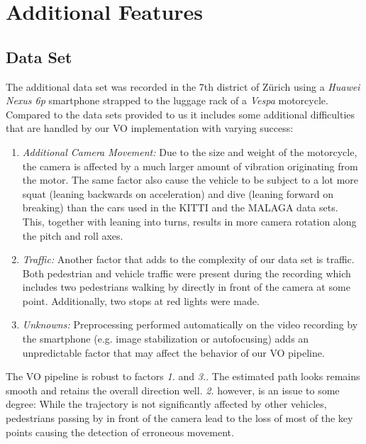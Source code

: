 \chapter{Additional Features}
\section{Data Set}
\label{dataset}

The additional data set was recorded in the 7th district of Zürich using a \emph{Huawei Nexus 6p} smartphone strapped to the luggage rack of a \emph{Vespa} motorcycle. 
Compared to the data sets provided to us it includes some additional difficulties that are handled by our VO implementation with varying success:\\

\begin{enumerate}
\item \emph{Additional Camera Movement:} Due to the size and weight of the motorcycle, the camera is affected by a much larger amount of vibration originating from the motor. 
The same factor also cause the vehicle to be subject to a lot more squat (leaning backwards on acceleration) and dive (leaning forward on breaking) than the cars used in the KITTI and the MALAGA data sets. 
This, together with leaning into turns, results in more camera rotation along the pitch and roll axes.

\item \emph{Traffic:} Another factor that adds to the complexity of our data set is traffic. 
Both pedestrian and vehicle traffic were present during the recording which includes two pedestrians walking by directly in front of the camera at some point.
Additionally, two stops at red lights were made.

\item \emph{Unknowns:} Preprocessing performed automatically on the video recording by the smartphone (e.g. image stabilization or autofocusing) adds an unpredictable factor that may affect the behavior of our VO pipeline.
\end{enumerate}

The VO pipeline is robust to factors \emph{1.} and \emph{3.}. 
The estimated path looks remains smooth and retains the overall direction well. 
\emph{2.} however, is an issue to some degree: While the trajectory is not significantly affected by other vehicles, pedestrians passing by in front of the camera lead to the loss of most of the key points causing the detection of erroneous movement.

